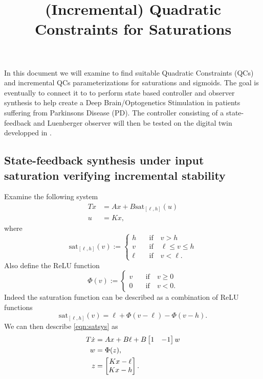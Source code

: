 \documentclass[10pt,a4paper]{article}
\title{(Incremental) Quadratic Constraints for Saturations}
\author{}
\theoremstyle{definition}
\theoremstyle{remark}
\begin{document}
\maketitle
In this document we will examine \cite{noori2024completesetquadraticconstraints}
to find suitable Quadratic Constraints (QCs) and incremental QCs parameterizations
for saturations and sigmoids. The goal is eventually to connect it to \cite{lenssen2026dual} to perform 
state based controller and observer synthesis to help create a Deep Brain/Optogenetics Stimulation 
in patients suffering from Parkinsons Disease (PD). The controller consisting of a state-feedback
and Luenberger observer will then be tested on the digital twin developped in \cite{fleming2020}.

\subsection{State-feedback synthesis under input saturation verifying incremental stability}
Examine the following system
\begin{align}\label{eqn:satsys}
    T\dot{x} &= Ax + B\mathrm{sat}_{[\ell,h]}(u)\\
    u &= Kx,
\end{align}
where
\begin{equation*}
    \mathrm{sat}_{[\ell,h]}(v) := \left\{\begin{aligned}
        h \quad &\text{if} \quad v > h\\
        v \quad &\text{if} \quad \ell \leq v \leq h\\
        \ell \quad &\text{if} \quad v < \ell.
    \end{aligned}\right.
\end{equation*}
Also define the ReLU function
\begin{equation*}
    \Phi(v) := \left\{\begin{aligned}
        v \quad &\text{if} \quad v\geq 0\\
        0 \quad &\text{if} \quad v < 0.
    \end{aligned}\right.
\end{equation*}
Indeed the saturation function can be described as a combination of ReLU functions
\begin{equation*}
    \mathrm{sat}_{[\ell, h]}(v) = \ell + \Phi(v-\ell) - \Phi(v-h).
\end{equation*}
We can then describe \eqref{eqn:satsys} as
\begin{align*}
    T\dot{x} &= Ax + B\ell + B\begin{bmatrix}1&-1\end{bmatrix}w \\
    w &= \Phi(z), \\
    z &= \begin{bmatrix}Kx-\ell\\Kx-h\end{bmatrix}.
\end{align*}
\end{document}
